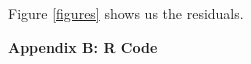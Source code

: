 \documentclass{article}\usepackage[]{graphicx}\usepackage[]{color}
\begin{document}
Figure \ref{figures} shows us the residuals.

  \newpage
  \noindent \Large{{\bf Appendix B: R Code}}
  
\end{document}
